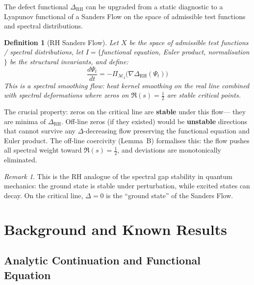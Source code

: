 \documentclass[11pt]{article}
\newtheorem{definition}[theorem]{Definition}
\theoremstyle{remark}
\newtheorem{remark}[theorem]{Remark}
\begin{document}
The defect functional $\Delta_{\mathrm{RH}}$ can be upgraded from a static diagnostic
to a Lyapunov functional of a Sanders Flow on the space of admissible test functions
and spectral distributions.

\begin{definition}[RH Sanders Flow]
Let $X$ be the space of admissible test functions / spectral distributions, let
$I = \{$functional equation, Euler product, normalisation$\}$ be the structural
invariants, and define:
\[
  \frac{d\Psi_t}{dt} = -\Pi_{\mathcal{M}_I}\!\bigl(\nabla \Delta_{\mathrm{RH}}(\Psi_t)\bigr)
\]
This is a \emph{spectral smoothing flow}: heat kernel smoothing on the real line
combined with spectral deformations where zeros on $\Re(s) = \tfrac{1}{2}$ are stable
critical points.
\end{definition}

\noindent
The crucial property: zeros on the critical line are \textbf{stable} under this flow---
they are minima of $\Delta_{\mathrm{RH}}$.  Off-line zeros (if they existed) would be
\textbf{unstable} directions that cannot survive any $\Delta$-decreasing flow preserving
the functional equation and Euler product.  The off-line coercivity (Lemma~B) formalises
this: the flow pushes all spectral weight toward $\Re(s) = \tfrac{1}{2}$, and deviations
are monotonically eliminated.

\begin{remark}
This is the RH analogue of the spectral gap stability in quantum mechanics: the
ground state is stable under perturbation, while excited states can decay. On the
critical line, $\Delta = 0$ is the ``ground state'' of the Sanders Flow.
\end{remark}

\section{Background and Known Results}
\label{sec:background}

\subsection{Analytic Continuation and Functional Equation}
\end{document}
